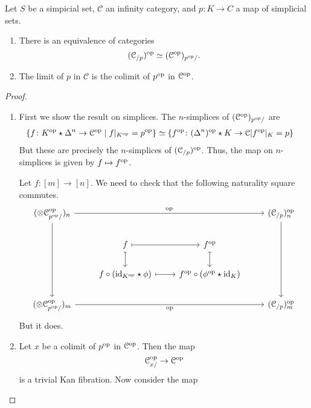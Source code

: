 \documentclass[main.tex]{subfiles}
\begin{document}
\begin{theorem}
  Let $S$ be a simpicial set, $\mathcal{C}$ an infinity category, and $p\colon K \to C$ a map of simplicial sets.
  \begin{enumerate}
    \item There is an equivalence of categories
      \begin{equation*}
        (\mathcal{C}_{/p})^{\mathrm{op}} \simeq (\mathcal{C}^{\mathrm{op}})_{p^{\mathrm{op}}/}.
      \end{equation*}

    \item The limit of $p$ in $\mathcal{C}$ is the colimit of $p^{\mathrm{op}}$ in $\mathcal{C}^{\mathrm{op}}$.
  \end{enumerate}
\end{theorem}
\begin{proof}
  \leavevmode
  \begin{enumerate}
    \item First we show the result on simplices. The $n$-simplices of $(\mathcal{C}^{\mathrm{op}})_{p^{\mathrm{op}}/}$ are
      \begin{align*}
        \{ f\colon K^{\mathrm{op}} \star \Delta^{n} \to \mathcal{C}^{\mathrm{op}} \mid f|_{K^{\mathrm{op}}} = p^{\mathrm{op}} \} &\simeq \{ f^{\mathrm{op}}\colon (\Delta^{n})^{\mathrm{op}} \star K \to \mathcal{C} | f^{\mathrm{op}}|_{K} = p \}
      \end{align*}
      But these are precisely the $n$-simplices of $(\mathcal{C}_{/p})^{\mathrm{op}}$. Thus, the map on $n$-simplices is given by $f \mapsto f^{\mathrm{op}}$.

      Let $f\colon [m] \to [n]$. We need to check that the following naturality square commutes.
      \begin{equation*}
        \begin{tikzcd}
          (\otimes{\mathcal{C}}{^{\mathrm{op}}_{p\op/}})_{n}
          \arrow[rrr, "\mathrm{op}"]
          \arrow[ddd]
          &&& (\mathcal{C}_{/p})_{n}\op
          \arrow[ddd]
          \\
          & f
          \arrow[r, mapsto]
          \arrow[d, mapsto]
          & f\op
          \arrow[d, mapsto]
          \\
          & f \circ(\id_{K\op} \star \phi)
          \arrow[r, mapsto]
          & f\op \circ (\phi\op \star \id_{K})
          \\
          (\otimes{\mathcal{C}}{^{\mathrm{op}}_{p\op/}})_{m}
          \arrow[rrr, swap, "\mathrm{op}"]
          &&& (\mathcal{C}_{/p})_{m}\op
        \end{tikzcd}
      \end{equation*}
      But it does.

    \item Let $x$ be a colimit of $p^{\mathrm{op}}$ in $\mathcal{C}^{\mathrm{op}}$. Then the map
      \begin{equation*}
        \mathcal{C}_{x/}^{\mathrm{op}} \to \mathcal{C}^{\mathrm{op}}
      \end{equation*}
      is a trivial Kan fibration. Now consider the map
  \end{enumerate}
\end{proof}
\end{document}
